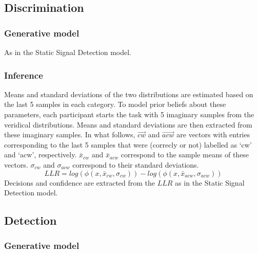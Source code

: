 \documentclass[12pt,twoside]{reedthesis}
\begin{document}
\hypertarget{discrimination-2}{%
\subsection{Discrimination}\label{discrimination-2}}

\hypertarget{generative-model-4}{%
\subsubsection*{Generative model}\label{generative-model-4}}

As in the Static Signal Detection model.

\hypertarget{inference-4}{%
\subsubsection*{Inference}\label{inference-4}}

Means and standard deviations of the two distributions are estimated based on the last 5 samples in each category. To model prior beliefs about these parameters, each participant starts the task with 5 imaginary samples from the veridical distributions. Means and standard deviations are then extracted from these imaginary samples. In what follows, \(\vec{cw}\) and \(\vec{acw}\) are vectors with entries corresponding to the last 5 samples that were (correcly or not) labelled as `cw' and `acw', respectively. \(\bar{x}_{cw}\) and \(\bar{x}_{acw}\) correspond to the sample means of these vectors. \(\sigma_{cw}\) and \(\sigma_{acw}\) correspond to their standard deviations.
\begin{equation}
LLR = log(\phi(x,\bar{x}_{cw},\sigma_{cw}))-log(\phi(x,\bar{x}_{acw},\sigma_{acw}))
\end{equation}
Decisions and confidence are extracted from the \(LLR\) as in the Static Signal Detection model.

\hypertarget{detection-4}{%
\subsection{Detection}\label{detection-4}}

\hypertarget{generative-model-5}{%
\subsubsection*{Generative model}\label{generative-model-5}}
\end{document}
